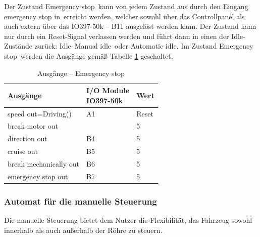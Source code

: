 Der Zustand \frqq Emergency stop\flqq\ kann von jedem Zustand aus durch den Eingang \frqq emergency stop in\flqq\ erreicht werden, welcher sowohl über das Controllpanel als auch extern über das IO397-50k – B11 ausgelöst werden kann. Der Zustand kann nur durch ein Reset-Signal verlassen werden und führt dann in einen der Idle-Zustände zurück: \frqq Idle\flqq\ \frqq Manual idle\flqq\ oder \frqq Automatic idle\flqq. Im Zustand \frqq Emergency stop\flqq\ werden die Ausgänge gemäß Tabelle \ref{Automat_man:tab:z_Emergency_stop} geschaltet.


\pagebreak[1]
\begin{table}[!ht]
	\centering
	\caption{Ausgänge – Emergency stop}
	\label{Automat_man:tab:z_Emergency_stop}
	\begin{tabular}{lll}
		\hline
		\textbf{Ausgänge}                           & \makecell{\textbf{I/O Module}         \\ \textbf{IO397-50k}}                 & \textbf{Wert} \\ \hline
		\multicolumn{1}{l|}{speed out=Driving()}    & \multicolumn{1}{l|}{A1}       & Reset \\
		\multicolumn{1}{l|}{break motor out}        & \multicolumn{1}{l|}{}         & 5     \\
		\multicolumn{1}{l|}{direction out}          & \multicolumn{1}{l|}{B4}       & 5     \\
		\multicolumn{1}{l|}{cruise out}             & \multicolumn{1}{l|}{B5}       & 5     \\
		\multicolumn{1}{l|}{break mechanically out} & \multicolumn{1}{l|}{B6}       & 5     \\
		\multicolumn{1}{l|}{emergency stop out}     & \multicolumn{1}{l|}{B7}       & 5     \\ \hline
	\end{tabular}
\end{table}
\pagebreak[1]










\subsubsection{Automat für die manuelle Steuerung}
\label{Automatensteuerung:Automat_man}

Die manuelle Steuerung bietet dem Nutzer die Flexibilität, das Fahrzeug sowohl innerhalb als auch außerhalb der Röhre zu steuern.\\


